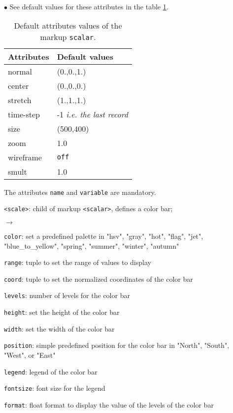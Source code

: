 \documentclass[a4paper,10pt,twoside]{csshortdoc}
\begin{document}
\begin{list}{$\bullet$}{}
See default values for these attributes in the table \ref{table:scalar}.

\begin{table}[htbp]
\begin{center}
\begin{tabular}{|l|l|}
\hline
\textbf{Attributes} & \textbf{Default values} \\
\hline
normal & (0.,0.,1.) \\
center & (0.,0.,0.) \\
stretch & (1.,1.,1.) \\
time-step & -1 \textit{i.e. the last record} \\
size & (500,400) \\
zoom & 1.0 \\
wireframe & \texttt{off} \\
smult & 1.0 \\
\hline
\end{tabular}
\end{center}
\caption{Default attributes values of the markup \texttt{scalar}.}
\label{table:scalar}
\end{table}

The attributes \texttt{name} and \texttt{variable} are mandatory.


\item \texttt{<scale>}: child of markup \texttt{<scalar>}, defines a color bar;
\begin{list}{$\rightarrow$}{}
\item \texttt{color}: set a predefined palette in "hsv", "gray", "hot", "flag", "jet", "blue\_to\_yellow", "spring", "summer", "winter", "autumn"
\item \texttt{range}: tuple to set the range of values to display
\item \texttt{coord}: tuple to set the normalized coordinates of the color bar
\item \texttt{levels}: number of levels for the color bar
\item \texttt{height}: set the height  of the color bar
\item \texttt{width}: set the width  of the color bar
\item \texttt{position}: simple predefined position for the color bar in "North", "South", "West", or "East"
\item \texttt{legend}: legend of the color bar
\item \texttt{fontsize}: font size for the legend
\item \texttt{format}: float format to display the value of the levels of the color bar
\end{list}


\end{list}
\end{document}
